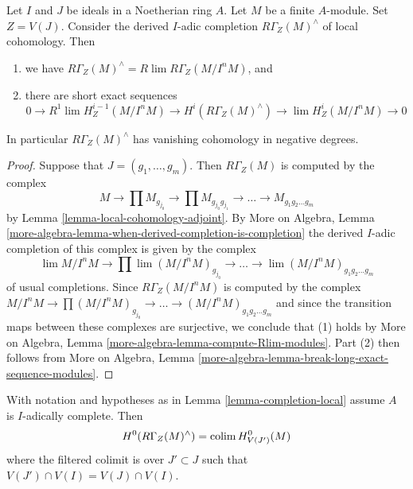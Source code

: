 \begin{lemma}
\label{lemma-completion-local}
Let $I$ and $J$ be ideals in a Noetherian ring $A$. Let $M$ be a finite
$A$-module. Set $Z =V(J)$. Consider the derived $I$-adic completion
$R\Gamma_Z(M)^\wedge$ of local cohomology. Then
\begin{enumerate}
\item we have $R\Gamma_Z(M)^\wedge = R\lim R\Gamma_Z(M/I^nM)$, and
\item there are short exact sequences
$$
0 \to R^1\lim H^{i - 1}_Z(M/I^nM) \to H^i(R\Gamma_Z(M)^\wedge) \to
\lim H^i_Z(M/I^nM) \to 0
$$
\end{enumerate}
In particular $R\Gamma_Z(M)^\wedge$ has vanishing cohomology
in negative degrees.
\end{lemma}

\begin{proof}
Suppose that $J = (g_1, \ldots, g_m)$.
Then $R\Gamma_Z(M)$ is computed by the complex
$$
M \to \prod M_{g_{j_0}} \to \prod M_{g_{j_0}g_{j_1}} \to
\ldots \to M_{g_1g_2\ldots g_m}
$$
by Lemma \ref{lemma-local-cohomology-adjoint}.
By More on Algebra, Lemma
\ref{more-algebra-lemma-when-derived-completion-is-completion}
the derived $I$-adic completion of
this complex is given by the complex
$$
\lim M/I^nM \to \prod \lim (M/I^nM)_{g_{j_0}} \to
\ldots \to \lim (M/I^nM)_{g_1g_2\ldots g_m}
$$
of usual completions. Since $R\Gamma_Z(M/I^nM)$ is computed by
the complex $ M/I^nM \to \prod (M/I^nM)_{g_{j_0}} \to
\ldots \to (M/I^nM)_{g_1g_2\ldots g_m}$ and since the
transition maps between these complexes are surjective,
we conclude that (1) holds by
More on Algebra, Lemma \ref{more-algebra-lemma-compute-Rlim-modules}.
Part (2) then follows from More on Algebra, Lemma
\ref{more-algebra-lemma-break-long-exact-sequence-modules}.
\end{proof}

\begin{lemma}
\label{lemma-completion-local-H0}
With notation and hypotheses as in Lemma \ref{lemma-completion-local}
assume $A$ is $I$-adically complete. Then
$$
H^0(R\Gamma_Z(M)^\wedge) = \mathop{\mathrm{colim}}\nolimits H^0_{V(J')}(M)
$$
where the filtered colimit is over $J' \subset J$ such that
$V(J') \cap V(I) = V(J) \cap V(I)$.
\end{lemma}

